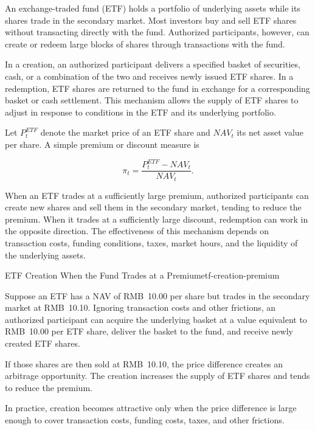 An exchange-traded fund (ETF) holds a portfolio of underlying assets while its shares trade in the secondary market. Most investors buy and sell ETF shares without transacting directly with the fund. Authorized participants, however, can create or redeem large blocks of shares through transactions with the fund.

In a creation, an authorized participant delivers a specified basket of securities, cash, or a combination of the two and receives newly issued ETF shares. In a redemption, ETF shares are returned to the fund in exchange for a corresponding basket or cash settlement. This mechanism allows the supply of ETF shares to adjust in response to conditions in the ETF and its underlying portfolio.

Let $P_t^{ETF}$ denote the market price of an ETF share and $\textit{NAV}_t$ its net asset value per share. A simple premium or discount measure is

\begin{equation}
\pi_t=
\frac{P_t^{ETF}-\textit{NAV}_t}{\textit{NAV}_t}.
\label{eq:ch14-etf-premium-discount}
\end{equation}

When an ETF trades at a sufficiently large premium, authorized participants can create new shares and sell them in the secondary market, tending to reduce the premium. When it trades at a sufficiently large discount, redemption can work in the opposite direction. The effectiveness of this mechanism depends on transaction costs, funding conditions, taxes, market hours, and the liquidity of the underlying assets.

\begin{example}{ETF Creation When the Fund Trades at a Premium}{etf-creation-premium}

Suppose an ETF has a NAV of RMB~10.00 per share but trades in the secondary market at RMB~10.10. Ignoring transaction costs and other frictions, an authorized participant can acquire the underlying basket at a value equivalent to RMB~10.00 per ETF share, deliver the basket to the fund, and receive newly created ETF shares.

If those shares are then sold at RMB~10.10, the price difference creates an arbitrage opportunity. The creation increases the supply of ETF shares and tends to reduce the premium.

In practice, creation becomes attractive only when the price difference is large enough to cover transaction costs, funding costs, taxes, and other frictions.

\end{example}

